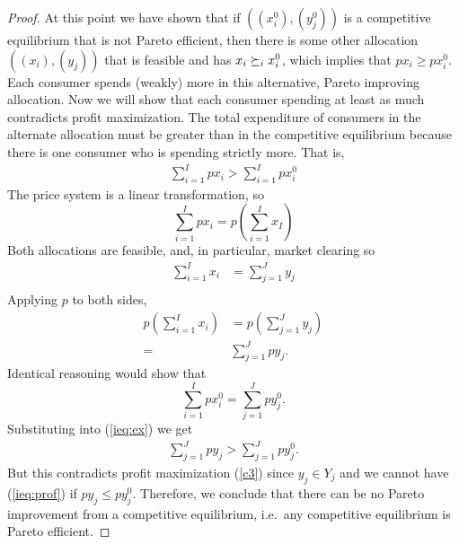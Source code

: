 \begin{proof}
  At this point we have shown that if $((x_i^0),(y_j^0))$ is a
  competitive equilibrium that is not Pareto efficient, then there is
  some other allocation $((x_i),(y_j))$ that is feasible and has $x_i
  \succeq_i x_i^0$, which implies that $p x_i \geq p x_i^0$. Each
  consumer spends (weakly) more in this alternative, Pareto improving
  allocation. Now we will show that each consumer spending at least as
  much contradicts profit maximization. The total expenditure of
  consumers in the alternate allocation must be greater than in the
  competitive equilibrium because there is one consumer who is
  spending strictly more. That is,
  \begin{align}
    \sum_{i=1}^I p x_i > \sum_{i=1}^I p x_i^0 \label{ieq:ex}
  \end{align}
  The price system is a linear transformation, so
  \[ \sum_{i=1}^I p x_i = p \left(\sum_{i=1}^I x_I \right) \]
  Both allocations are feasible, and, in particular, market clearing
  so
  \begin{align*}
    \sum_{i=1}^I x_i & = \sum_{j=1}^J y_j \\
  \end{align*}
  Applying $p$ to both sides, 
  \begin{align*}
    p\left( \sum_{i=1}^I x_i\right) & = p\left( \sum_{j=1}^J y_j
    \right) \\ 
    = & \sum_{j=1}^J p y_j.
  \end{align*}
  Identical reasoning would show that 
  \[ \sum_{i=1}^I p x_i^0 = \sum_{j=1}^J p y_j^0. \]
  Substituting into (\ref{ieq:ex}) we get
  \begin{align}
    \sum_{j=1}^J p y_j > \sum_{j=1}^J p y_j^0. \label{ieq:prof}
  \end{align}
  But this contradicts profit maximization (\ref{c3}) since $y_j \in
  Y_j$ and we cannot have (\ref{ieq:prof}) if $p y_j \leq p y_j^0$. 
  Therefore, we conclude that there can be no Pareto improvement from
  a competitive equilibrium, i.e.\ any competitive equilibrium is
  Pareto efficient.
\end{proof}

